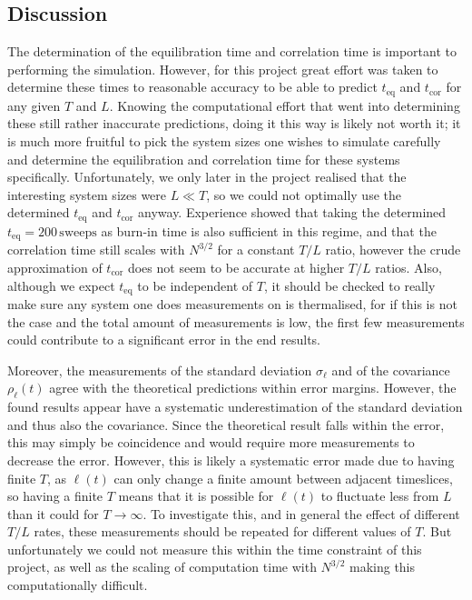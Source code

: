 \subsection{Discussion}\label{sec:discussion}
The determination of the equilibration time and correlation time is important to performing the simulation.
However, for this project great effort was taken to determine these times to reasonable accuracy to be able to predict $t_\text{eq}$ and $t_\text{cor}$ for any given $T$ and $L$.
Knowing the computational effort that went into determining these still rather inaccurate predictions, doing it this way is likely not worth it; it is much more fruitful to pick the system sizes one wishes to simulate carefully and determine the equilibration and correlation time for these systems specifically.
Unfortunately, we only later in the project realised that the interesting system sizes were $L \ll T$, so we could not optimally use the determined $t_\text{eq}$ and $t_\text{cor}$ anyway.
Experience showed that taking the determined $t_\text{eq} = 200 \, \text{sweeps}$ as burn-in time is also sufficient in this regime, and that the correlation time still scales with $N^{3/2}$ for a constant $T/L$ ratio, however the crude approximation of $t_\text{cor}$ does not seem to be accurate at higher $T/L$ ratios.
Also, although we expect $t_\text{eq}$ to be independent of $T$, it should be checked to really make sure any system one does measurements on is thermalised, for if this is not the case and the total amount of measurements is low, the first few measurements could contribute to a significant error in the end results.

Moreover, the measurements of the standard deviation $\sigma_\ell$ and of the covariance $\rho_\ell(t)$ agree with the theoretical predictions within error margins.
However, the found results appear have a systematic underestimation of the standard deviation and thus also the covariance.
Since the theoretical result falls within the error, this may simply be coincidence and would require more measurements to decrease the error.
However, this is likely a systematic error made due to having finite $T$, as $\ell(t)$ can only change a finite amount between adjacent timeslices, so having a finite $T$ means that it is possible for $\ell(t)$ to fluctuate less from $L$ than it could for $T \rightarrow \infty$.
To investigate this, and in general the effect of different $T/L$ rates, these measurements should be repeated for different values of $T$.
But unfortunately we could not measure this within the time constraint of this project, as well as the scaling of computation time with $N^{3/2}$ making this computationally difficult.

